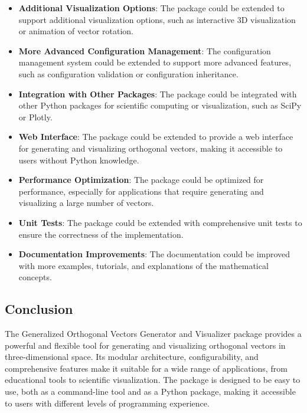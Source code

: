 \begin{itemize}
    \item \textbf{Additional Visualization Options}: The package could be extended to support additional visualization options, such as interactive 3D visualization or animation of vector rotation.
    
    \item \textbf{More Advanced Configuration Management}: The configuration management system could be extended to support more advanced features, such as configuration validation or configuration inheritance.
    
    \item \textbf{Integration with Other Packages}: The package could be integrated with other Python packages for scientific computing or visualization, such as SciPy or Plotly.
    
    \item \textbf{Web Interface}: The package could be extended to provide a web interface for generating and visualizing orthogonal vectors, making it accessible to users without Python knowledge.
    
    \item \textbf{Performance Optimization}: The package could be optimized for performance, especially for applications that require generating and visualizing a large number of vectors.
    
    \item \textbf{Unit Tests}: The package could be extended with comprehensive unit tests to ensure the correctness of the implementation.
    
    \item \textbf{Documentation Improvements}: The documentation could be improved with more examples, tutorials, and explanations of the mathematical concepts.
\end{itemize}

\subsection{Conclusion}

The Generalized Orthogonal Vectors Generator and Visualizer package provides a powerful and flexible tool for generating and visualizing orthogonal vectors in three-dimensional space. Its modular architecture, configurability, and comprehensive features make it suitable for a wide range of applications, from educational tools to scientific visualization. The package is designed to be easy to use, both as a command-line tool and as a Python package, making it accessible to users with different levels of programming experience.
